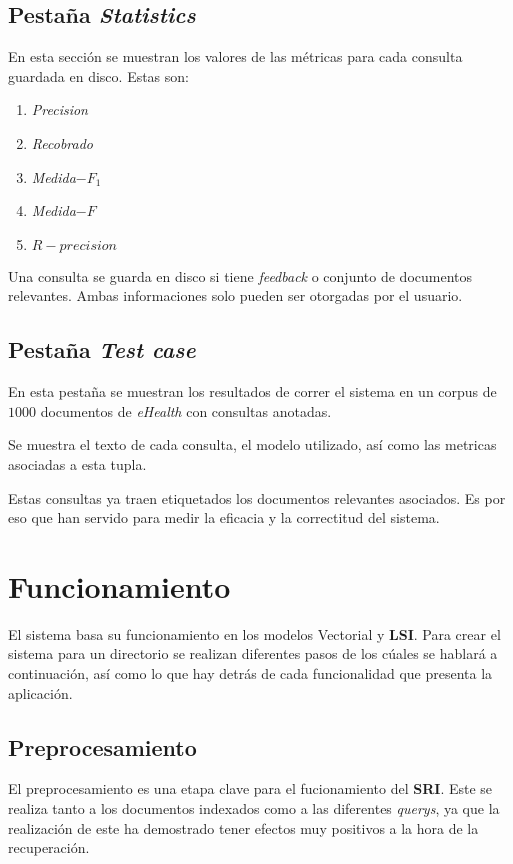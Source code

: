\documentclass{llncs}
\begin{document}
  \subsection{Pestaña \emph{Statistics}}

    En esta sección se muestran los valores de las métricas para cada consulta guardada en disco. Estas son:

    \begin{enumerate}
      \item \emph{Precision}
      \item \emph{Recobrado}
      \item \emph{Medida$-F_{1}$}
      \item \emph{Medida$-F$}
      \item \emph{$R-precision$}
    \end{enumerate}

    Una consulta se guarda en disco si tiene \emph{feedback} o conjunto de documentos relevantes. Ambas informaciones solo pueden ser otorgadas por el usuario.

  \subsection{Pestaña \emph{Test case}}

    En esta pestaña se muestran los resultados de correr el sistema en un corpus de $1000$ documentos de \emph{eHealth} con consultas anotadas. 

    Se muestra el texto de cada consulta, el modelo utilizado, así como las metricas asociadas a esta tupla.

    Estas consultas ya traen etiquetados los documentos relevantes asociados. Es por eso que han servido para medir la eficacia y la correctitud del sistema. 

\section{Funcionamiento}

  El sistema basa su funcionamiento en los modelos Vectorial y \textbf{LSI}. Para crear el sistema para un directorio se realizan diferentes pasos de los cúales se hablará a continuación, así como lo que hay detrás de cada funcionalidad que presenta la aplicación.

  \subsection{Preprocesamiento}
    El preprocesamiento es una etapa clave para el fucionamiento del \textbf{SRI}. Este se realiza tanto a los documentos indexados como a las diferentes \emph{querys}, ya que la realización de este ha demostrado tener efectos muy positivos a la hora de la recuperación.
\end{document}
